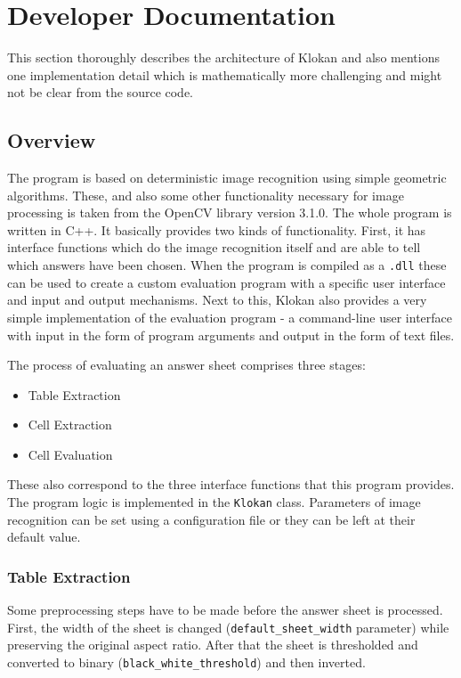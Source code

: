 \documentclass{article}
\begin{document}
\section{Developer Documentation}{
This section thoroughly describes the architecture of Klokan and also mentions one implementation detail which is mathematically more challenging and might not be clear from the source code.
	\subsection{Overview}{
	The program is based on deterministic image recognition using simple geometric algorithms. These, and also some other functionality necessary for image processing is taken from the OpenCV library version 3.1.0. The whole program is written in C++. It basically provides two kinds of functionality. First, it has interface functions which do the image recognition itself and are able to tell which answers have been chosen. When the program is compiled as a \verb+.dll+ these can be used to create a custom evaluation program with a specific user interface and input and output mechanisms. Next to this, Klokan also provides a very simple implementation of the evaluation program - a command-line user interface with input in the form of program arguments and output in the form of text files.
	
	The process of evaluating an answer sheet comprises three stages:
	\begin{itemize}
		\item Table Extraction
		\item Cell Extraction
		\item Cell Evaluation
	\end{itemize}

	These also correspond to the three interface functions that this program provides. The program logic is implemented in the \verb+Klokan+ class. Parameters of image recognition can be set using a configuration file or they can be left at their default value.

		\subsubsection{Table Extraction}{
		Some preprocessing steps have to be made before the answer sheet is processed. First, the width of the sheet is changed (\verb+default_sheet_width+ parameter) while preserving the original aspect ratio. After that the sheet is thresholded and converted to binary (\verb+black_white_threshold+) and then inverted.

}}}
\end{document}
